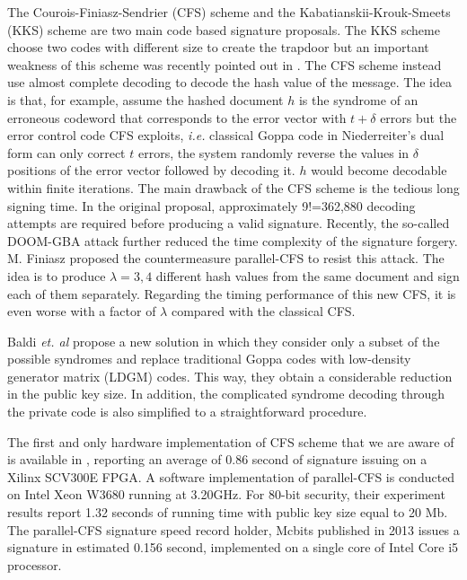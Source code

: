 \documentclass[10pt,journal,compsoc]{IEEEtran}
\begin{document}
The Courois-Finiasz-Sendrier (CFS) scheme\cite{courtois2001achieve} and the Kabatianskii-Krouk-Smeets (KKS) scheme\cite{kabatianskii1997digital,kabatiansky2005error,barreto2011one} are two main code based signature proposals. The KKS scheme choose two codes with different size to create the trapdoor but an important weakness of this scheme was recently pointed out in \cite{otmani2011efficient}.
The CFS scheme instead use almost complete decoding to decode the hash value of the message. The idea is that, for example, assume the hashed document $h$ is the syndrome of an erroneous codeword that corresponds to the error vector with
$t + \delta$ errors but the error control code CFS exploits, \textit{i.e.} classical Goppa code in Niederreiter's dual form\cite{niederreiter1986knapsack} can only correct $t$ errors, the system randomly
reverse the values in $\delta$ positions of the error vector followed
by decoding it.  $h$ would become decodable within finite iterations. The main drawback of the CFS scheme is the tedious long signing time. In the original proposal, approximately 9!=362,880 decoding attempts are required before producing a valid signature. Recently, the so-called DOOM-GBA attack\cite{landais2012cfs} further reduced the time complexity of the signature forgery. M. Finiasz proposed the countermeasure parallel-CFS\cite{finiasz2011parallel} to resist this attack. The idea is to produce $\lambda=3,4$ different hash values from the same document and sign each of them separately. Regarding the timing performance of this new CFS, it is even worse with a factor of $\lambda$ compared with the classical CFS.

Baldi \textit{et. al} propose a new solution\cite{baldi2013using} in which they consider only a subset of the possible syndromes
and replace traditional Goppa codes with low-density generator matrix (LDGM) codes\cite{baldi2007cryptanalysis,baldi2007quasi,baldi2008new,baldi2016enhanced}. This way, they obtain a considerable reduction in the public key size. In addition, the complicated syndrome decoding through the private code is also simplified to a straightforward procedure.

The first and only hardware implementation of CFS scheme that we are aware of is available in \cite{beuchat2004fpga}, reporting an average of 0.86 second of signature issuing on a Xilinx SCV300E FPGA. A software implementation of parallel-CFS\cite{landais2012cfs,landais2012implementing} is conducted  on Intel Xeon W3680 running at 3.20GHz. For 80-bit security, their experiment results report 1.32 seconds of running time with public key size equal to 20 Mb. The parallel-CFS signature speed record holder, Mcbits\cite{bernstein2013mcbits} published in 2013 issues a signature in estimated 0.156 second, implemented on a single core of Intel Core i5 processor.
\end{document}
